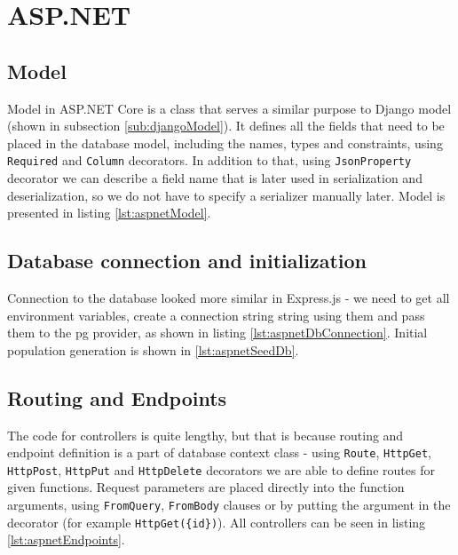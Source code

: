 %
%
\section{ASP.NET}
\subsection{Model}
Model in ASP.NET Core is a class that serves a similar purpose to Django model (shown in subsection \ref{sub:djangoModel}). It defines all the fields that need to be placed in the database model, including the names, types and constraints, using \lstinline{Required} and \lstinline{Column} decorators. In addition to that, using \lstinline{JsonProperty} decorator we can describe a field name that is later used in serialization and deserialization, so we do not have to specify a serializer manually later. Model is presented in listing \ref{lst:aspnetModel}.


\subsection{Database connection and initialization}
Connection to the database looked more similar in Express.js - we need to get all environment variables, create a connection string string using them and pass them to the \acrlong{pg} provider, as shown in listing \ref{lst:aspnetDbConnection}. Initial population generation is shown in \ref{lst:aspnetSeedDb}.



\subsection{Routing and Endpoints}
The code for controllers is quite lengthy, but that is because routing and endpoint definition is a part of database context class - using \lstinline{Route}, \lstinline{HttpGet}, \lstinline{HttpPost}, \lstinline{HttpPut} and \lstinline{HttpDelete} decorators we are able to define routes for given functions. Request parameters are placed directly into the function arguments, using \lstinline{FromQuery}, \lstinline{FromBody} clauses or by putting the argument in the decorator (for example \lstinline[mathescape]!HttpGet({id})!). All controllers can be seen in listing \ref{lst:aspnetEndpoints}.


%
%
